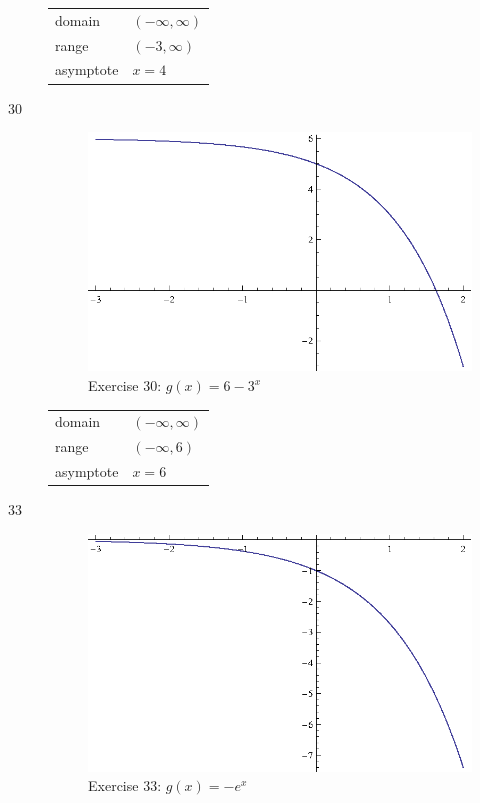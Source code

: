 \documentclass{exam}
\begin{document}
\begin{description}
      \begin{tabular}[H]{ll}
        \toprule
        domain    & $(-\infty, \infty)$ \\
        range     & $(-3, \infty)$ \\
        asymptote & $x = 4$ \\
        \bottomrule
      \end{tabular}

    \item[30] 
      \begin{figure}[H]
        \centering
        \includegraphics[scale=1.0]{exercise30.eps}
        \caption*{Exercise 30: $g(x) = 6 - 3^x$}
      \end{figure}

      \begin{tabular}[H]{ll}
        \toprule
        domain    & $(-\infty, \infty)$ \\
        range     & $(-\infty, 6)$ \\
        asymptote & $x = 6$ \\
        \bottomrule
      \end{tabular}

    \item[33] 
      \begin{figure}[H]
        \centering
        \includegraphics[scale=1.0]{exercise33.eps}
        \caption*{Exercise 33: $g(x) = -e^x$}
      \end{figure}


\end{description}
\end{document}
